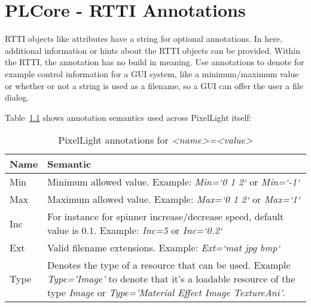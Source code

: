 \chapter{PLCore - RTTI Annotations}
\label{Appendix:RTTIAnnotations}
RTTI objects like attributes have a string for optional annotations. In here, additional information or hints about the RTTI objects can be provided. Within the RTTI, the annotation has no build in meaning. Use annotations to denote for example control information for a GUI system, like a minimum/maximum value or whether or not a string is used as a filename, so a GUI can offer the user a file dialog.

Table~\ref{Table:PixelLightAnnotations} shows annotation semantics used across PixelLight itself:
\begin{table}[htb]
	\centering
	\begin{tabular}{|l|p{}|}
		\hline
		\textbf{Name} & \textbf{Semantic}\\
		\hline
		\hline
		Min  & Minimum allowed value. Example: \emph{Min=`0 1 2`} or \emph{Min=`-1`}\\
		\hline
		Max  & Maximum allowed value. Example: \emph{Max=`0 1 2`} or \emph{Max=`1`}\\
		\hline
		Inc  & For instance for spinner increase/decrease speed, default value is $0.1$. Example: \emph{Inc=5} or \emph{Inc=`0.2`}\\
		\hline
		Ext  & Valid filename extensions. Example: \emph{Ext=`mat jpg bmp`}\\
		\hline
		Type & Denotes the type of a resource that can be used. Example \emph{Type='Image'} to denote that it's a loadable resource of the type \emph{Image} or \emph{Type='Material Effect Image TextureAni'}.\\
		\hline
	\end{tabular} 
	\caption{PixelLight annotations for \emph{<name>=<value>}}
	\label{Table:PixelLightAnnotations}
\end{table}
